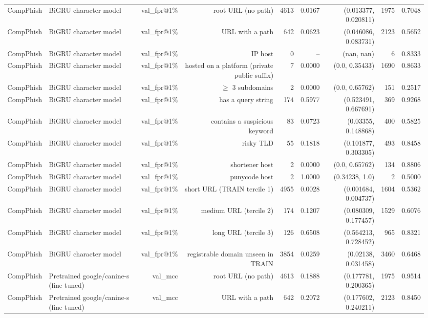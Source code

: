 \begin{table}[t]
\begin{tabular}{llrrrrrrr}
CompPhish & BiGRU character model & val\_fpr@1\% & root URL (no path) & 4613 & 0.0167 & (0.013377, 0.020811) & 1975 & 0.7048 \\
CompPhish & BiGRU character model & val\_fpr@1\% & URL with a path & 642 & 0.0623 & (0.046086, 0.083731) & 2123 & 0.5652 \\
CompPhish & BiGRU character model & val\_fpr@1\% & IP host & 0 & -- & (nan, nan) & 6 & 0.8333 \\
CompPhish & BiGRU character model & val\_fpr@1\% & hosted on a platform (private public suffix) & 7 & 0.0000 & (0.0, 0.35433) & 1690 & 0.8633 \\
CompPhish & BiGRU character model & val\_fpr@1\% & $\geq$ 3 subdomains & 2 & 0.0000 & (0.0, 0.65762) & 151 & 0.2517 \\
CompPhish & BiGRU character model & val\_fpr@1\% & has a query string & 174 & 0.5977 & (0.523491, 0.667691) & 369 & 0.9268 \\
CompPhish & BiGRU character model & val\_fpr@1\% & contains a suspicious keyword & 83 & 0.0723 & (0.03355, 0.148868) & 400 & 0.5825 \\
CompPhish & BiGRU character model & val\_fpr@1\% & risky TLD & 55 & 0.1818 & (0.101877, 0.303305) & 493 & 0.8458 \\
CompPhish & BiGRU character model & val\_fpr@1\% & shortener host & 2 & 0.0000 & (0.0, 0.65762) & 134 & 0.8806 \\
CompPhish & BiGRU character model & val\_fpr@1\% & punycode host & 2 & 1.0000 & (0.34238, 1.0) & 2 & 0.5000 \\
CompPhish & BiGRU character model & val\_fpr@1\% & short URL (TRAIN tercile 1) & 4955 & 0.0028 & (0.001684, 0.004737) & 1604 & 0.5362 \\
CompPhish & BiGRU character model & val\_fpr@1\% & medium URL (tercile 2) & 174 & 0.1207 & (0.080309, 0.177457) & 1529 & 0.6076 \\
CompPhish & BiGRU character model & val\_fpr@1\% & long URL (tercile 3) & 126 & 0.6508 & (0.564213, 0.728452) & 965 & 0.8321 \\
CompPhish & BiGRU character model & val\_fpr@1\% & registrable domain unseen in TRAIN & 3854 & 0.0259 & (0.02138, 0.031458) & 3460 & 0.6468 \\
CompPhish & Pretrained google/canine-s (fine-tuned) & val\_mcc & root URL (no path) & 4613 & 0.1888 & (0.177781, 0.200365) & 1975 & 0.9514 \\
CompPhish & Pretrained google/canine-s (fine-tuned) & val\_mcc & URL with a path & 642 & 0.2072 & (0.177602, 0.240211) & 2123 & 0.8450 \\

\end{tabular}
\end{table}
